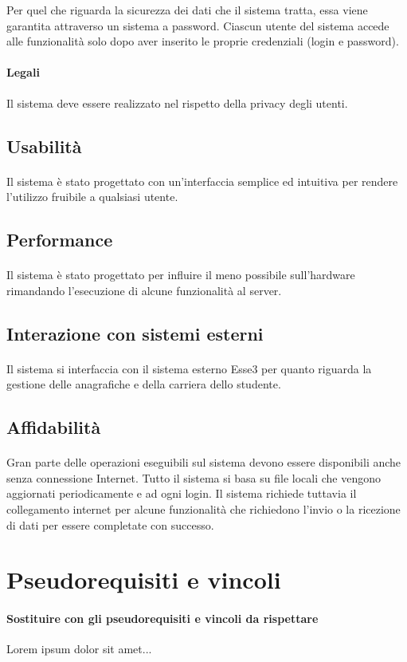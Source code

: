 Per quel che riguarda la sicurezza dei dati che il sistema tratta, essa viene garantita attraverso un sistema a password. Ciascun utente del sistema accede alle funzionalità solo dopo aver inserito le proprie credenziali (login e password).

\paragraph{Legali\\}
Il sistema deve essere realizzato nel rispetto della privacy degli utenti.

\subsection{Usabilità}
\paragraph{} 
Il sistema è stato progettato con un’interfaccia semplice ed intuitiva per rendere l’utilizzo fruibile a qualsiasi utente.

\subsection{Performance}
\paragraph{} 
Il sistema è stato progettato per influire il meno possibile sull’hardware rimandando l’esecuzione di alcune funzionalità al server.

\subsection{Interazione con sistemi esterni}
\paragraph{} 
Il sistema si interfaccia con il sistema esterno Esse3 per quanto riguarda la gestione delle anagrafiche e della carriera dello studente.

\subsection{Affidabilità}
\paragraph{} 
Gran parte delle operazioni eseguibili sul sistema devono essere disponibili anche senza connessione Internet. Tutto il sistema si basa su file locali che vengono aggiornati periodicamente e ad ogni login. Il sistema richiede tuttavia il collegamento internet per alcune funzionalità che richiedono l’invio o la ricezione di dati per essere completate con successo.

\section{Pseudorequisiti e vincoli}
\paragraph{Sostituire con gli pseudorequisiti e vincoli da rispettare \\}
Lorem ipsum dolor sit amet...

\clearpage